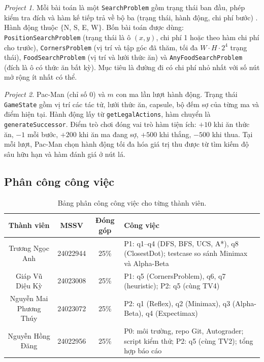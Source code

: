 \documentclass[conference]{IEEEtran}
\begin{document}
\textit{Project 1.} Mỗi bài toán là một \texttt{SearchProblem} gồm trạng thái ban đầu, phép kiểm tra đích và hàm kế tiếp trả về bộ ba (trạng thái, hành động, chi phí bước) \cite{b1}. Hành động thuộc $\{$N, S, E, W$\}$. Bốn bài toán được dùng: \texttt{PositionSearchProblem} (trạng thái là ô $(x,y)$, chi phí 1 hoặc theo hàm chi phí cho trước), \texttt{CornersProblem} (vị trí và tập góc đã thăm, tối đa $W\!\cdot\!H\!\cdot\!2^{4}$ trạng thái), \texttt{FoodSearchProblem} (vị trí và lưới thức ăn) và \texttt{AnyFoodSearchProblem} (đích là ô có thức ăn bất kỳ). Mục tiêu là đường đi có chi phí nhỏ nhất với số nút mở rộng ít nhất có thể.

\textit{Project 2.} Pac-Man (chỉ số 0) và $m$ con ma lần lượt hành động. Trạng thái \texttt{GameState} gồm vị trí các tác tử, lưới thức ăn, capsule, bộ đếm sợ của từng ma và điểm hiện tại. Hành động lấy từ \texttt{getLegalActions}, hàm chuyển là \texttt{generateSuccessor}. Điểm trò chơi đóng vai trò hàm tiện ích: $+10$ khi ăn thức ăn, $-1$ mỗi bước, $+200$ khi ăn ma đang sợ, $+500$ khi thắng, $-500$ khi thua. Tại mỗi lượt, Pac-Man chọn hành động tối đa hóa giá trị thu được từ tìm kiếm độ sâu hữu hạn và hàm đánh giá ở nút lá.

\subsection{Phân công công việc}

\begin{table}[H]
    \centering
    \renewcommand{\arraystretch}{1.15}
    \scriptsize
    \setlength{\tabcolsep}{3pt}
    \caption{Bảng phân công công việc cho từng thành viên.}
    \label{tab:phancong}
    \begin{tabularx}{\columnwidth}{cccX}
    \toprule
        \textbf{Thành viên} & \textbf{MSSV} & \textbf{Đóng góp} & \textbf{Công việc} \\
    \midrule
        Trương Ngọc Anh & 24022944 & 25\% & P1: q1--q4 (DFS, BFS, UCS, A*), q8 (ClosestDot); testcase so sánh Minimax và Alpha-Beta \\
        Giáp Vũ Diệu Kỳ & 24023008 & 25\% & P1: q5 (CornersProblem), q6, q7 (heuristic); P2: q5 (cùng TV4) \\
        Nguyễn Mai Phương Thúy & 24023072 & 25\% & P2: q1 (Reflex), q2 (Minimax), q3 (Alpha-Beta), q4 (Expectimax) \\
        Nguyễn Hồng Đăng & 24022956 & 25\% & P0: môi trường, repo Git, Autograder; script kiểm thử; P2: q5 (cùng TV2); tổng hợp báo cáo \\
    \bottomrule
    \end{tabularx}
\end{table}
\end{document}
